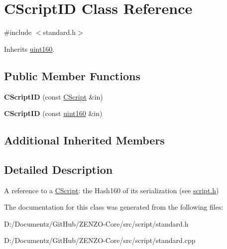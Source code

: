 \hypertarget{class_c_script_i_d}{}\section{C\+Script\+ID Class Reference}
\label{class_c_script_i_d}


{\ttfamily \#include $<$standard.\+h$>$}



Inherits \mbox{\hyperlink{classuint160}{uint160}}.

\subsection*{Public Member Functions}
\begin{DoxyCompactItemize}
\item 
\mbox{\label{class_c_script_i_d_ae1bc1fb715b094e03c21a237f7045902}} 
{\bfseries C\+Script\+ID} (const \mbox{\hyperlink{class_c_script}{C\+Script}} \&in)
\item 
\mbox{\label{class_c_script_i_d_a69619562a6a5fdf4ccfd20fee9418cc5}} 
{\bfseries C\+Script\+ID} (const \mbox{\hyperlink{classuint160}{uint160}} \&in)
\end{DoxyCompactItemize}
\subsection*{Additional Inherited Members}


\subsection{Detailed Description}
A reference to a \mbox{\hyperlink{class_c_script}{C\+Script}}\+: the Hash160 of its serialization (see \mbox{\hyperlink{script_8h_source}{script.\+h}}) 

The documentation for this class was generated from the following files\+:\begin{DoxyCompactItemize}
\item 
D\+:/\+Documentz/\+Git\+Hub/\+Z\+E\+N\+Z\+O-\/\+Core/src/script/standard.\+h\item 
D\+:/\+Documentz/\+Git\+Hub/\+Z\+E\+N\+Z\+O-\/\+Core/src/script/standard.\+cpp\end{DoxyCompactItemize}
